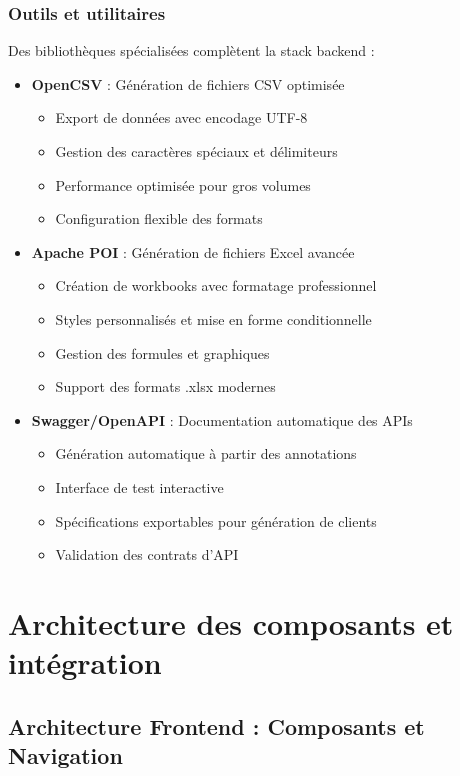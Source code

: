 \documentclass[12pt,a4paper]{report}
\begin{document}
\subsubsection{Outils et utilitaires}
Des bibliothèques spécialisées complètent la stack backend :

\begin{itemize}
\item \textbf{OpenCSV} : Génération de fichiers CSV optimisée
  \begin{itemize}
  \item Export de données avec encodage UTF-8
  \item Gestion des caractères spéciaux et délimiteurs
  \item Performance optimisée pour gros volumes
  \item Configuration flexible des formats
  \end{itemize}

\item \textbf{Apache POI} : Génération de fichiers Excel avancée
  \begin{itemize}
  \item Création de workbooks avec formatage professionnel
  \item Styles personnalisés et mise en forme conditionnelle
  \item Gestion des formules et graphiques
  \item Support des formats .xlsx modernes
  \end{itemize}

\item \textbf{Swagger/OpenAPI} : Documentation automatique des APIs
  \begin{itemize}
  \item Génération automatique à partir des annotations
  \item Interface de test interactive
  \item Spécifications exportables pour génération de clients
  \item Validation des contrats d'API
  \end{itemize}
\end{itemize}

\section{Architecture des composants et intégration}

\subsection{Architecture Frontend : Composants et Navigation}
\end{document}
